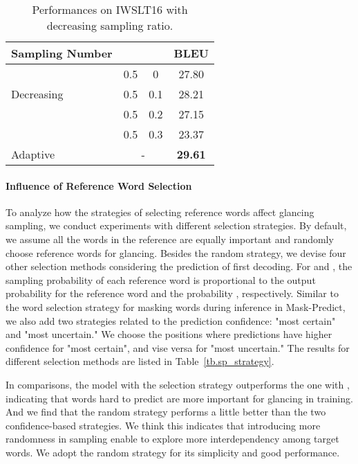 \begin{table}[!tbp]
\small
\centering
\begin{tabular}{lccc}
\toprule
Sampling Number&  &  & BLEU \\
\midrule
\multirow{3}{*}{Decreasing} & 0.5 & 0 & 27.80  \\
& 0.5 & 0.1 & 28.21  \\
& 0.5 & 0.2 & 27.15 \\
& 0.5 & 0.3 & 23.37 \\
\midrule
Adaptive & \multicolumn{2}{c}{-} & \textbf{29.61}  \\
\bottomrule
\end{tabular}
\caption{\label{tb.adaptive_base} Performances on IWSLT16 with decreasing sampling ratio.}
\end{table}
\paragraph{Influence of Reference Word Selection}
To analyze how the strategies of selecting reference words affect glancing sampling, we conduct experiments with different selection strategies. By default, we assume all the words in the reference are equally important and randomly choose reference words for glancing.
Besides the random strategy, we devise four other selection methods considering the prediction of first decoding. 
For  and , the sampling probability of each reference word is proportional to the output probability for the reference word  and the probability , respectively. Similar to the word selection strategy for masking words during inference in Mask-Predict, we also add two strategies related to the prediction confidence: "most certain" and "most uncertain." We choose the positions where predictions have higher confidence for "most certain", and vise versa for "most uncertain." The results for different selection methods are listed in Table~\ref{tb.sp_strategy}.

In comparisons, the model with the selection strategy  outperforms the one with , indicating that words hard to predict are more important for glancing in training. 
And we find that the random strategy performs a little better than the two confidence-based strategies. We think this indicates that introducing more randomness in sampling enable \method to explore more interdependency among target words. We adopt the random strategy for its simplicity and good performance.

